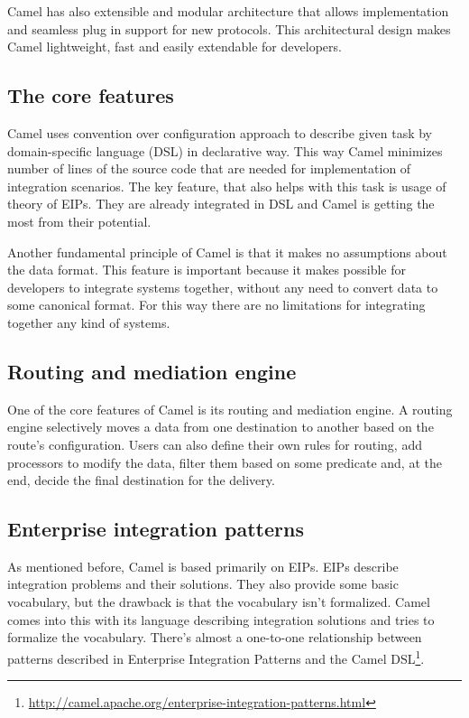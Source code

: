 \documentclass[12pt,final,oneside]{fithesis2}
\begin{document}
Camel has also extensible and modular architecture that allows implementation and seamless plug in support for new protocols. This architectural design makes Camel lightweight, fast and easily extendable for developers.\cite{camel-in-action}

\subsection{The core features}
Camel uses convention over configuration approach to describe given task by domain-specific language (DSL) in declarative way. This way Camel minimizes number of lines of the source code that are needed for implementation of integration scenarios. The key feature, that also helps with this task is usage of theory of EIPs. They are already integrated in DSL and Camel is getting the most from their potential. 

Another fundamental principle of Camel is that it makes no assumptions about the data format. This feature is important because it makes possible for developers to integrate systems together, without any need to convert data to some canonical format. For this way there are no limitations for integrating together any kind of systems\cite{camel-in-action}.

\subsection*{Routing and mediation engine}
One of the core features of Camel is its routing and mediation engine. A routing engine selectively moves a data from one destination to another based on the route's configuration. Users can also define their own rules for routing, add processors to modify the data, filter them based on some predicate and, at the end, decide the final destination for the delivery.

\subsection*{Enterprise integration patterns}
As mentioned before, Camel is based primarily on EIPs. EIPs describe integration problems and their solutions. They also provide some basic vocabulary, but the drawback is that the vocabulary isn't formalized. Camel comes into this with its language describing integration solutions and tries to formalize the vocabulary. There's almost a one-to-one relationship between patterns described in
Enterprise Integration Patterns and the Camel DSL\footnote{\url{http://camel.apache.org/enterprise-integration-patterns.html}}.
\end{document}

